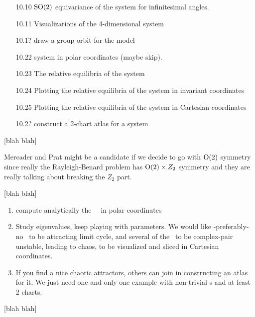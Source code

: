 \documentclass[aip,cha,reprint,
secnumarabic,
nofootinbib, tightenlines,
nobibnotes, showkeys, showpacs,
groupedaddress
]{revtex4-1}
\begin{document}
\begin{itemize}
  \item[10.10] $\textrm{SO}(2)$ equivariance of the {\twoMode} system
           for infinitesimal angles.
  \item[10.11] Visualizations of the 4-dimensional {\twoMode} system
  \item[10.1?] draw a group orbit for the {\twoMode} model
  \item[10.22] {\twoMode} system in polar coordinates (maybe skip).
  \item[10.23] The relative equilibria of the {\twoMode} system
  \item[10.24] Plotting the relative equilibria of
           the {\twoMode} system in invariant coordinates
  \item[10.25] Plotting the relative equilibria of
           the {\twoMode} system in Cartesian coordinates
  \item[10.2?] construct a 2-chart atlas for a {\twoMode} system
\end{itemize}


 [blah blah]

Mercader and Prat might
be a candidate if we decide to go with $\textrm{O}(2)$ symmetry since really the
Rayleigh-Benard problem has $\textrm{O}(2) \times Z_2$ symmetry and they are really
talking about breaking the $Z_2$ part.

 [blah blah]


\begin{enumerate}
  \item
        compute analytically the \stabmat\ \Mvar\ in polar coordinates
  \item
        Study eigenvalues, keep playing with parameters. We would like
        -preferably- no \reqv\ to be attracting limit cycle, and several of
        the \reqva\ to be complex-pair unstable, leading to chaos, to be
        visualized and sliced in Cartesian coordinates.
  \item
        If you find a nice chaotic attractors, others can join in
        constructing an atlas for it. We just need one and only one
        example with non-trivial \chartBord s and at least 2 charts.
\end{enumerate}

 [blah blah]
\end{document}
